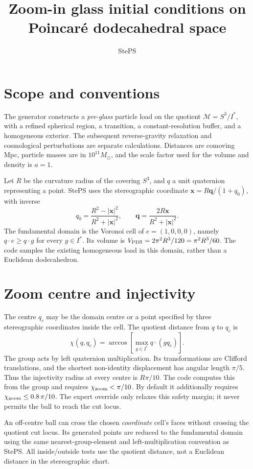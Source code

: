 \documentclass[11pt]{article}
\title{Zoom-in glass initial conditions on Poincar\'e dodecahedral space}
\author{StePS}
\date{}
\begin{document}
\maketitle

\section{Scope and conventions}
The generator constructs a \emph{pre-glass} particle load on the quotient
\(\mathcal M=S^3/I^*\), with a refined spherical region, a transition, a
constant-resolution buffer, and a homogeneous exterior.  The subsequent
reverse-gravity relaxation and cosmological perturbations are separate
calculations.  Distances are comoving Mpc, particle masses are in
\(10^{11}M_\odot\), and the scale factor used for the volume and density is
\(a=1\).

Let \(R\) be the curvature radius of the covering \(S^3\), and \(q\) a unit
quaternion representing a point. StePS uses the stereographic coordinate
\(\boldsymbol{x}=R\boldsymbol{q}/(1+q_0)\), with inverse
\[
 q_0=\frac{R^2-|\boldsymbol{x}|^2}{R^2+|\boldsymbol{x}|^2},
 \qquad
 \boldsymbol q=\frac{2R\boldsymbol{x}}{R^2+|\boldsymbol{x}|^2}.
\]
The fundamental domain is the Voronoi cell of \(e=(1,0,0,0)\), namely
\(q\cdot e\ge q\cdot g\) for every \(g\in I^*\).  Its volume is
\(V_{\rm PDS}=2\pi^2R^3/120=\pi^2R^3/60\).  The code samples the existing
homogeneous load in this domain, rather than a Euclidean dodecahedron.

\section{Zoom centre and injectivity}
The centre \(q_c\) may be the domain centre or a point specified by three
stereographic coordinates inside the cell.  The quotient distance from \(q\)
to \(q_c\) is
\[
 \chi(q,q_c)=\arccos\!\left[\max_{g\in I^*} q\cdot(gq_c)\right].
\]
The group acts by left quaternion multiplication.  Its transformations are
Clifford translations, and the shortest non-identity displacement has
angular length \(\pi/5\). Thus the injectivity radius at every centre is
\(R\pi/10\). The code computes this from the group and requires
\(\chi_{\rm zoom}<\pi/10\). By default it additionally requires
\(\chi_{\rm zoom}\le0.8\,\pi/10\). The expert override only relaxes this
safety margin; it never permits the ball to reach the cut locus.

An off-centre ball can cross the chosen \emph{coordinate} cell's faces without
crossing the quotient cut locus. Its generated points are reduced to the
fundamental domain using the same nearest-group-element and left-multiplication
convention as StePS. All inside/outside tests use the quotient distance, not a
Euclidean distance in the stereographic chart.
\end{document}
